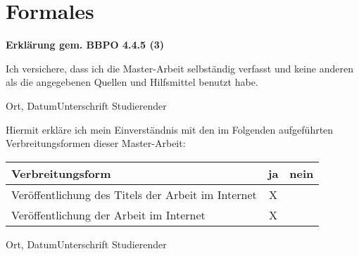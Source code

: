 \pagestyle{empty} %


\chapter*{Formales} %
\label{cha:formales}
\textbf{Erklärung gem. BBPO 4.4.5 (3)}

\vspace{20pt}

Ich versichere, dass ich die Master-Arbeit selbständig verfasst und keine anderen als
die angegebenen Quellen und Hilfsmittel benutzt habe. 

\vspace{20pt}

Ort, Datum\hfill Unterschrift Studierender

\vspace{25pt}

\noindent\makebox[5cm]{\hrulefill} \hfill \makebox[5cm]{\hrulefill}

\vspace{40pt}

\vspace{40pt}

Hiermit erkläre ich mein Einverständnis mit den im Folgenden aufgeführten
Verbreitungsformen dieser Master-Arbeit: 

\begin{center}
  \begin{tabular}{ | l | c | c | }
    \hline
    \textbf{Verbreitungsform}                                             & \textbf{ja} & \textbf{nein} \\ \hline
    Veröffentlichung des Titels der Arbeit im Internet      & X           &               \\ \hline
    Veröffentlichung der Arbeit im Internet     & X           &               \\ \hline
  \end{tabular}
\end{center}

\vspace{20pt}

Ort, Datum\hfill Unterschrift Studierender

\vspace{25pt}

\noindent\makebox[5cm]{\hrulefill} \hfill \makebox[5cm]{\hrulefill}